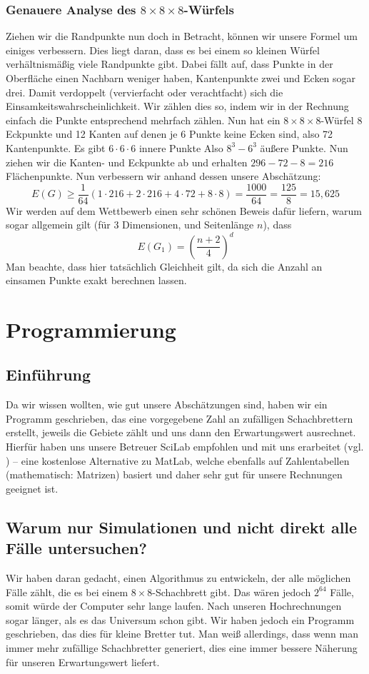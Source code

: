 \documentclass[11pt,a4paper]{article}
\numberwithin{equation}{section}
\numberwithin{table}{section}
\numberwithin{figure}{section}
\begin{document}
\subsubsection{Genauere Analyse des \texorpdfstring{$8\times 8\times 8$}{8x8x8}-Würfels}
Ziehen wir die Randpunkte nun doch in Betracht, können wir unsere Formel um einiges verbessern. Dies liegt daran, dass es bei einem so kleinen Würfel verhältnismäßig viele Randpunkte gibt.  Dabei fällt auf, dass Punkte in der Oberfläche einen Nachbarn weniger haben, Kantenpunkte zwei und Ecken sogar drei. Damit verdoppelt (vervierfacht oder verachtfacht) sich die Einsamkeitswahrscheinlichkeit. Wir zählen dies so, indem wir in der Rechnung einfach die Punkte entsprechend mehrfach zählen. Nun hat ein $8\times 8 \times 8$-Würfel 8 Eckpunkte und 12 Kanten auf denen je 6 Punkte keine Ecken sind, also 72 Kantenpunkte. Es gibt $6 \cdot 6 \cdot 6$ innere Punkte Also $8^3-6^3$ äußere Punkte. Nun ziehen wir die Kanten- und Eckpunkte ab und erhalten $296-72-8=216$ Flächenpunkte. Nun verbessern wir anhand dessen unsere Abschätzung:
$$E(G)\geq \frac{1}{64}(1\cdot 216+2 \cdot 216+4 \cdot 72+8 \cdot 8)=\dfrac{1000}{64}=\dfrac{125}{8}=15,625$$
Wir werden auf dem Wettbewerb einen sehr schönen Beweis dafür liefern, warum sogar allgemein gilt (für 3 Dimensionen, und Seitenlänge $n$), dass
$$E(G_1)=\left(\dfrac{n+2}{4}\right)^d$$
Man beachte, dass hier tatsächlich Gleichheit gilt, da sich die Anzahl an einsamen Punkte exakt berechnen lassen.

\section{Programmierung}
\subsection{Einführung}
Da wir wissen wollten, wie gut unsere Abschätzungen sind, haben wir ein Programm geschrieben, das eine vorgegebene Zahl an zufälligen Schachbrettern erstellt, jeweils die Gebiete zählt und uns dann den Erwartungswert ausrechnet. Hierfür haben uns unsere Betreuer SciLab empfohlen und mit uns erarbeitet (vgl. \cite{scilab}) -- eine kostenlose Alternative zu MatLab, welche ebenfalls auf Zahlentabellen (mathematisch: Matrizen) basiert
und daher sehr gut für unsere Rechnungen geeignet ist.
\subsection{Warum nur Simulationen und nicht direkt alle Fälle untersuchen?}
Wir haben daran gedacht, einen Algorithmus zu entwickeln, der alle möglichen Fälle zählt, die es bei einem $8\times 8$-Schachbrett gibt. Das wären jedoch $2^{64}$ Fälle, somit würde der Computer sehr lange laufen. Nach unseren Hochrechnungen sogar länger, als es das Universum schon gibt. Wir haben jedoch ein Programm geschrieben, das dies für kleine Bretter tut. Man weiß allerdings, dass wenn man immer mehr zufällige Schachbretter generiert, dies eine immer bessere Näherung für unseren Erwartungswert liefert.
\end{document}
